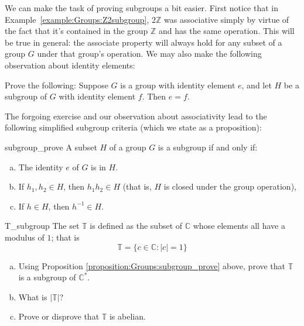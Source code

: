 We can make the task of proving subgroups  a bit easier. First notice that in Example~\ref{example:Groups:Z2subgroup},  $2{\mathbb Z}$ was  associative simply by virtue of the fact that it's contained in the  group ${\mathbb Z}$ and has the same operation.  This will be true in general: the associate property will always hold for any subset of a group $G$ under that group's operation. We may also make the following observation about identity elements:

\begin{exercise}{65}
Prove the following: Suppose $G$ is a group with identity element $e$, and let $H$ be a subgroup of $G$ with identity element $f$.  Then $e=f$.
\end{exercise}

The forgoing exercise and our observation about associativity lead to the following simplified subgroup criteria (which we state as a proposition):

\begin{prop}{subgroup_prove}
A subset $H$ of a group $G$ is a subgroup if and only if: 
\begin{enumerate}[(a)]
 
 \item
The identity $e$ of $G$ is in $H$. 
 
\item
If $h_1, h_2 \in H$, then $h_1h_2 \in H$ (that is, $H$ is closed under the group operation), 
 
\item
If $h \in H$, then $h^{-1} \in H$.
 
\end{enumerate}
\end{prop}
 
\begin{exercise}{T_subgroup}
The set ${\mathbb T}$ is defined as the subset of  ${\mathbb C}$ whose elements all have a modulus of $1$; that is
\[
{\mathbb T} = \{c \in {\mathbb C} :  | c | =1 \} \]

\begin{enumerate}[(a)]
\item
Using Proposition \ref{proposition:Groups:subgroup_prove} above, prove that ${\mathbb T}$ is a subgroup of ${\mathbb C}^{\ast}$.
\item
What is $| {\mathbb T} |$?
\item
Prove or disprove that ${\mathbb T}$ is abelian.
\end{enumerate}
\end{exercise}

